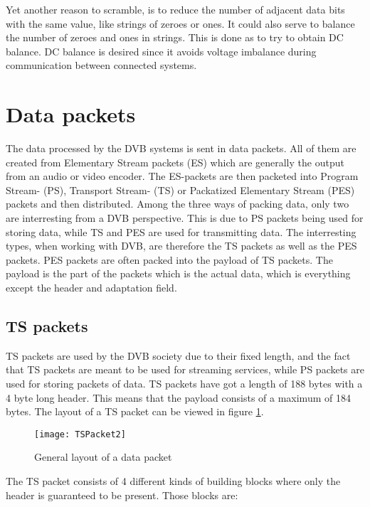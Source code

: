 
Yet another reason to scramble, is to reduce the number of adjacent 
data bits with the same value, like strings of zeroes or ones. It could 
also serve to balance the number of zeroes and ones in strings. This is 
done as to try to obtain DC balance. DC balance is desired since it 
avoids voltage imbalance during communication between connected systems.
\section{Data packets}\label{sec:Data}
The data processed by the DVB systems is sent in data packets. All of 
them are created from Elementary Stream packets (ES) which are 
generally the output from an audio or video encoder. The ES-packets are 
then packeted into Program Stream- (PS), Transport Stream- (TS) or 
Packatized Elementary Stream (PES) packets and then distributed. Among 
the three ways of packing data, only two are interresting from a DVB 
perspective. This is due to PS packets being used for storing data, 
while TS and PES are used for transmitting data. The interresting 
types, when working with DVB, are therefore the TS packets as well as 
the PES packets. PES packets are often packed into the payload of TS 
packets. The payload is the part of the packets which is the actual 
data, which is everything except the header and adaptation field.

\subsection{TS packets}
TS packets are used by the DVB society due to their fixed length, and 
the fact that TS packets are meant to be used for streaming services, 
while PS packets are used for storing packets of data. TS packets have 
got a length of 188 bytes with a 4 byte long header. This means that 
the payload consists of a maximum of 184 bytes. The layout of a TS 
packet can be viewed in figure \ref{img:Package}\citep{DVB:2013}.

\begin{figure}[h!]
  \texttt{[image: TSPacket2]}
  \caption{General layout of a data packet}
  \label{img:Package}
\end{figure}

The TS packet consists of 4 different kinds of building blocks where 
only the header is guaranteed to be present. Those blocks are:

